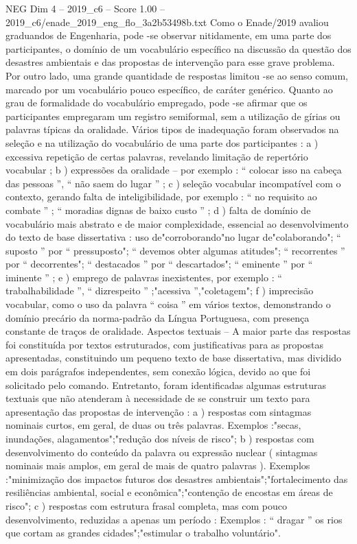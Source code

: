 \begin{textsample}{NEG Dim 4 – 2019\_c6 – Score 1.00 – 2019\_c6/enade\_2019\_eng\_flo\_3a2b53498b.txt}
Como o Enade/2019 avaliou graduandos de Engenharia, pode -se observar nitidamente, em uma parte dos participantes, o domínio de um vocabulário específico na discussão da questão dos desastres ambientais e das propostas de intervenção para esse grave problema.
Por outro lado, uma grande quantidade de respostas limitou -se ao senso comum, marcado por um vocabulário pouco específico, de caráter genérico.
Quanto ao grau de formalidade do vocabulário empregado, pode -se afirmar que os participantes empregaram um registro semiformal, sem a utilização de gírias ou palavras típicas da oralidade.
Vários tipos de inadequação foram observados na seleção e na utilização do vocabulário de uma parte dos participantes : a ) excessiva repetição de certas palavras, revelando limitação de repertório vocabular ; b ) expressões da oralidade – por exemplo : “ colocar isso na cabeça das pessoas ”, “ não saem do lugar ” ; c ) seleção vocabular incompatível com o contexto, gerando falta de inteligibilidade, por exemplo : “ no requisito ao combate ” ; “ moradias dignas de baixo custo ” ; d ) falta de domínio de vocabulário mais abstrato e de maior complexidade, essencial ao desenvolvimento do texto de base dissertativa : uso de"corroborando"no lugar de"colaborando"; “ suposto ” por “ pressuposto"; “ devemos obter algumas atitudes"; “ recorrentes ” por “ decorrentes"; “ destacados ” por “ descartados"; “ eminente ” por “ iminente ” ; e ) emprego de palavras inexistentes, por exemplo : “ trabalhabilidade ”, “ dizrespeito ” ;"acessiva ”,"coletagem"; f ) imprecisão vocabular, como o uso da palavra “ coisa ” em vários textos, demonstrando o domínio precário da norma-padrão da Língua Portuguesa, com presença constante de traços de oralidade.
Aspectos textuais – A maior parte das respostas foi constituída por textos estruturados, com justificativas para as propostas apresentadas, constituindo um pequeno texto de base dissertativa, mas dividido em dois parágrafos independentes, sem conexão lógica, devido ao que foi solicitado pelo comando.
Entretanto, foram identificadas algumas estruturas textuais que não atenderam à necessidade de se construir um texto para apresentação das propostas de intervenção : a ) respostas com sintagmas nominais curtos, em geral, de duas ou três palavras.
Exemplos :"secas, inundações, alagamentos";"redução dos níveis de risco"; b ) respostas com desenvolvimento do conteúdo da palavra ou expressão nuclear ( sintagmas nominais mais amplos, em geral de mais de quatro palavras ).
Exemplos :"minimização dos impactos futuros dos desastres ambientais";"fortalecimento das resiliências ambiental, social e econômica";"contenção de encostas em áreas de risco"; c ) respostas com estrutura frasal completa, mas com pouco desenvolvimento, reduzidas a apenas um período : Exemplos : “ dragar ” os rios que cortam as grandes cidades";"estimular o trabalho voluntário".

\end{textsample}
